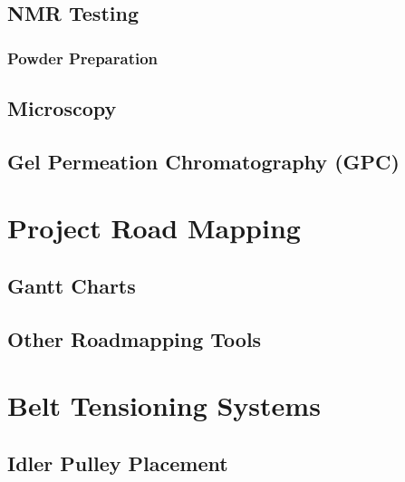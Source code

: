 \subsection{NMR Testing\label{sec:literatureReview:characterization:NMR}}

\subsubsection{Powder Preparation\label{sec:literatureReview:characterization:powderPrep}}

\subsection{Microscopy\label{sec:literatureReview:characterization:microscopy}}

\subsection{Gel Permeation Chromatography (GPC)\label{sec:literatureReview:characterization:GPC}}

\section{Project Road Mapping\label{sec:literatureReview:roadmapping}}

\subsection{Gantt Charts\label{sec:literatureReview:roadmapping:gantt}}

\subsection{Other Roadmapping Tools\label{sec:literatureReview:roadmapping:otherTools}}

\section{Belt Tensioning Systems\label{sec:literatureReview:beltTension}}

\subsection{Idler Pulley Placement\label{sec:literatureReview:beltTension:idler}}
